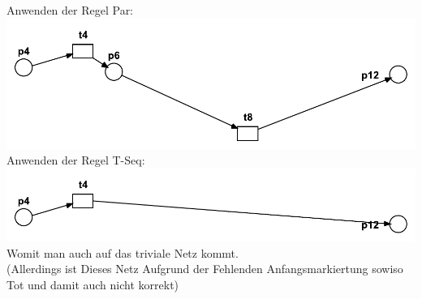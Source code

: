     Anwenden der Regel Par:\\
 \includegraphics[scale=0.3]{Teilaufgaben/par1-2.pdf}\\
 
     Anwenden der Regel T-Seq:\\
 \includegraphics[scale=0.3]{Teilaufgaben/tseq1-2.pdf}\\
 
 Womit man auch auf das triviale Netz kommt.\\
 (Allerdings ist Dieses Netz Aufgrund der Fehlenden Anfangsmarkiertung sowiso Tot und damit auch nicht korrekt)